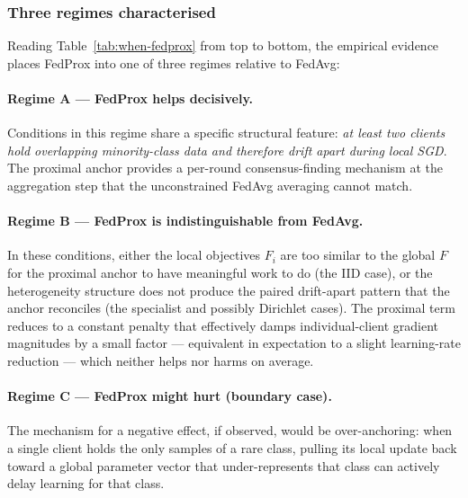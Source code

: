 \subsubsection{Three regimes characterised}
\label{sec:when-fedprox-regimes}

Reading Table~\ref{tab:when-fedprox} from top to bottom, the
empirical evidence places FedProx into one of three regimes
relative to FedAvg:

\paragraph{Regime A — FedProx helps decisively.}
Conditions in this regime share a specific structural feature:
\emph{at least two clients hold overlapping minority-class data
and therefore drift apart during local SGD}. The proximal anchor
provides a per-round consensus-finding mechanism at the
aggregation step that the unconstrained FedAvg averaging cannot
match. 

\paragraph{Regime B — FedProx is indistinguishable from FedAvg.}
 In these conditions, either the local
objectives $F_i$ are too similar to the global $F$ for the
proximal anchor to have meaningful work to do (the IID case), or
the heterogeneity structure does not produce the paired
drift-apart pattern that the anchor reconciles (the specialist
and possibly Dirichlet cases). The proximal term reduces to a
constant penalty that effectively damps individual-client
gradient magnitudes by a small factor — equivalent in expectation
to a slight learning-rate reduction — which neither helps nor
harms on average.

\paragraph{Regime C — FedProx might hurt (boundary case).}
The mechanism for a negative effect, if observed, would be
over-anchoring: when a single client holds the only samples of a
rare class, pulling its local update back toward a global
parameter vector that under-represents that class can actively
delay learning for that class.


